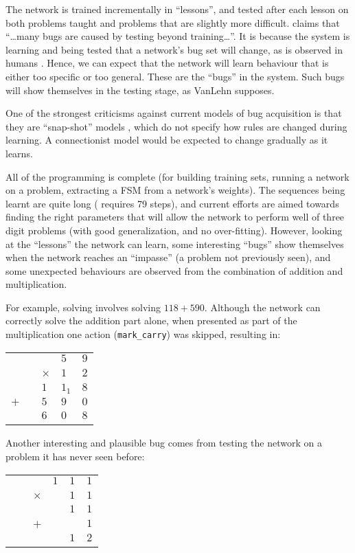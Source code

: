 The network
is trained incrementally in ``lessons'', and tested after each lesson on
both problems taught and problems that are slightly more difficult.
 claims that ``\ldots many bugs are caused by
testing beyond training\ldots''.  It is because the system is learning and
being tested that a network's bug set will change, as is observed in humans
\cite{nicodesi}. Hence, we can expect that the network will learn behaviour
that is either too specific or too general.  These are the ``bugs'' in the
system.  Such bugs will show themselves in the testing stage, as VanLehn
supposes.

One of the strongest criticisms against current models of bug acquisition
is that they are ``snap-shot'' models \cite{hennwhy}, which do not specify
how rules are changed during learning.  A connectionist model would be
expected to change gradually as it learns.


All of the programming is complete (for building training sets, running a
network on a problem, extracting a FSM from a network's weights).  The
sequences being learnt are quite long ( requires 79 steps), and
current efforts are aimed towards finding the right parameters that will
allow the network to perform well of three digit problems (with good
generalization, and no over-fitting). However, looking at the ``lessons''
the network can learn, some interesting ``bugs'' show themselves when the
network reaches an ``impasse'' (a problem not previously seen), and some
unexpected behaviours are observed from the combination of addition and
multiplication.

For example, solving  involves solving $118+590$.  Although the
network can correctly solve the addition part alone, when presented as part
of the multiplication one action (\verb|mark_carry|) was skipped, resulting
in:
\begin{center}
\begin{tabular}{lllll}
&&&$5_{}$&$9_{}$\\
&&$\times$&$1_{}$&$2_{}$\\
\cline{3-5}
&&$1_{}$&$1_{1}$&$8_{}$\\
$+$&&$5_{}$&$9_{}$&$0_{}$\\
\cline{1-5}
&&$6_{}$&$0_{}$&$8_{}$\\
\end{tabular}
\end{center}


Another interesting and plausible bug comes from testing the network on a
problem it has never seen before:
\begin{center}
\begin{tabular}{llllll}
&&&$1_{}$&$1_{}$&$1_{}$\\
&&$\times$&&$1_{}$&$1_{}$\\
\cline{3-6}
&&&&$1_{}$&$1_{}$\\
&&$+$&&&$1_{}$\\
\cline{3-6}
&&&&$1_{}$&$2_{}$\\
\end{tabular}
\end{center}

